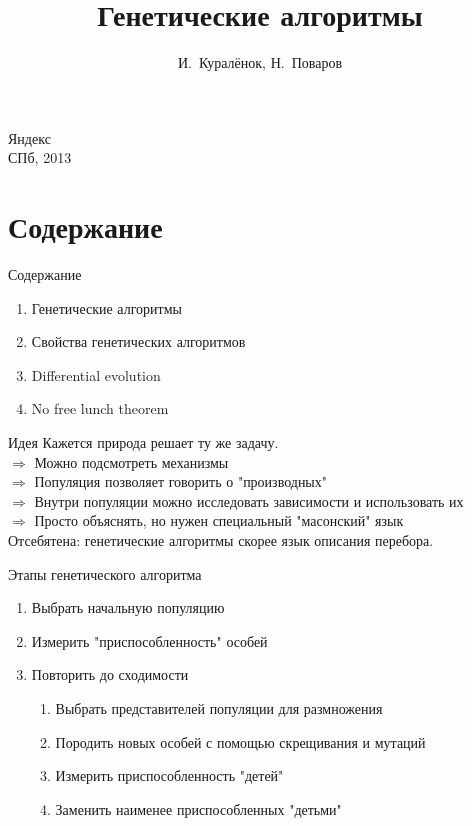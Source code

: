 \documentclass[14pt, fleqn, xcolor={dvipsnames, table}]{beamer}
\title{Генетические алгоритмы\\\small{}}
\author[]{\small{%
И.~Куралёнок,
Н.~Поваров}}
\date{}
\begin{document}
\begin{frame}
\maketitle
\small
\begin{center}
\vspace{-60pt}
\normalsize {\color{red}Я}ндекс \\
\vspace{80pt}
\footnotesize СПб, 2013
\end{center}
\end{frame}

\section{Содержание}
\begin{frame}{Содержание}
\begin{enumerate}
  \item Генетические алгоритмы
  \item Свойства генетических алгоритмов
  \item Differential evolution
  \item No free lunch theorem
\end{enumerate}
\end{frame}

\begin{frame}{Идея}
Кажется природа решает ту же задачу. \\
$\Rightarrow$ Можно подсмотреть механизмы \\
$\Rightarrow$ Популяция позволяет говорить о "производных" \\
$\Rightarrow$ Внутри популяции можно исследовать зависимости и использовать их \\
$\Rightarrow$ Просто объяснять, но нужен специальный "масонский" язык \\
Отсебятена: генетические алгоритмы скорее язык описания перебора.
\end{frame}

\begin{frame}{Этапы генетического алгоритма}
\begin{enumerate}
  \item Выбрать начальную популяцию
  \item Измерить "приспособленность" особей
  \item Повторить до сходимости
  \begin{enumerate}
    \item Выбрать представителей популяции для размножения
    \item Породить новых особей с помощью скрещивания и мутаций
    \item Измерить приспособленность "детей"
    \item Заменить наименее приспособленных "детьми"
  \end{enumerate}
\end{enumerate}
\end{frame}
\end{document}
